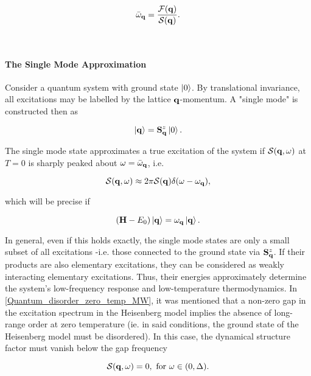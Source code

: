 \documentclass{homework}
\begin{document}
\begin{equation}
    \bar{\omega}_{{\bf q}} = \frac{\mathcal{F}({\bf q})}{\mathcal{S}({\bf q})}. 
    \label{Goldstone_char_freq}
\end{equation}

\blanky \\

\paragraph{The Single Mode Approximation}

Consider a quantum system with ground state $\ket{0}$. By translational invariance, all excitations may be labelled by the lattice ${\bf q}$-momentum. A "single mode" is constructed then as 

\begin{equation}
    \ket{{\bf q}} = {\bf S}^z_{{\bf q}} \ket{0}.
\end{equation}

The single mode state approximates a true excitation of the system if $\mathcal{S}({\bf q}, \omega)$ at $T = 0$ is sharply peaked about $\omega = \bar{\omega}_{\bf q}$, i.e.

\begin{equation}
    \mathcal{S}({\bf q}, \omega) \approx 2\pi \mathcal{S}({\bf q}) \delta(\omega- \omega_{\bf q}),
\end{equation}

which will be precise if 

\begin{equation}
    ({\bf H} - E_0)\ket{{\bf q}} = \omega_{{\bf q}} \ket{{\bf q}}.
\end{equation}

In general, even if this holds exactly, the single mode states are only a small subset of all excitations -i.e. those connected to the ground state via ${\bf S}^z_{\bf q}$. If their products are also elementary excitations, they can be considered as weakly interacting elementary excitations. Thus, their energies approximately determine the system's low-frequency response and low-temperature thermodynamics. In \cref{Quantum_disorder_zero_temp_MW}, it was mentioned that a non-zero gap in the excitation spectrum in the Heisenberg model implies the absence of long-range order at zero temperature (ie. in said conditions, the ground state of the Heisenberg model must be disordered). In this case, the dynamical structure factor must vanish below the gap frequency 

\begin{equation}
    \mathcal{S}({\bf q}, \omega) = 0, \textnormal{ for } \omega \in (0, \Delta).
\end{equation}
\end{document}
